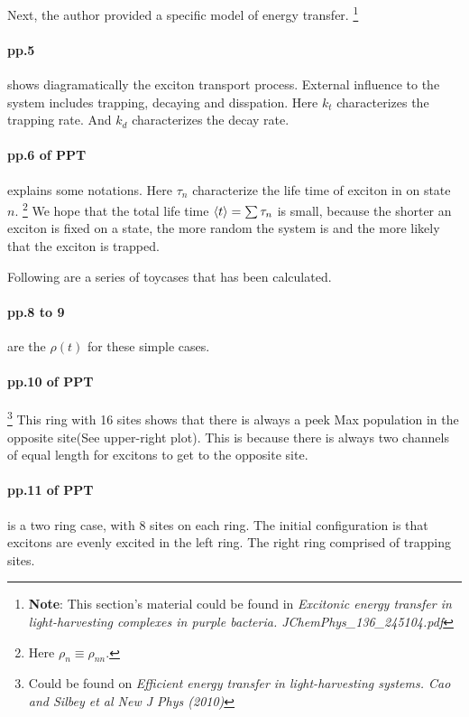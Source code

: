 \documentclass{article}
\numberwithin{equation}{subsection} %
\theoremstyle{definition}
\begin{document}
Next, the author provided a specific model of energy transfer.
\footnote{
\textbf{Note}: This section's material could be found in
\textit{Excitonic energy transfer in light-harvesting complexes 
in purple bacteria. JChemPhys\_136\_245104.pdf}
}

\paragraph{pp.5} shows diagramatically the exciton transport process.
External influence to the system includes trapping, decaying and disspation.
Here $k_t$ characterizes the trapping rate. And $k_d$ characterizes
the decay rate.

\paragraph{pp.6 of PPT} explains some notations.
Here $\tau_n$ characterize the life time 
of exciton in on state $n$. \footnote{ Here
$\rho_n \equiv \rho_{nn}$.} We hope that the total life time
$\braket{t} = \sum \tau_n$
is small, because the shorter an exciton is fixed on a state,
the more random the system is and the more likely that the exciton
is trapped.

Following are a series of toycases that has been calculated.

\paragraph{pp.8 to 9} are the $\rho(t)$ for these simple cases.

\paragraph{pp.10 of PPT}
\footnote{Could be found on \textit{Efficient energy transfer in 
light-harvesting systems. Cao and Silbey et al New J Phys (2010)}}
This ring with 16 sites shows that there is always 
a peek Max population in the opposite site(See upper-right plot). This is
because there is always
two channels of equal length for excitons to get to the opposite site.

\paragraph{pp.11 of PPT} is 
a two ring case, with 8 sites on each ring. The initial configuration
is that excitons are evenly excited in the left ring. 
The right ring comprised of trapping sites.
\end{document}
